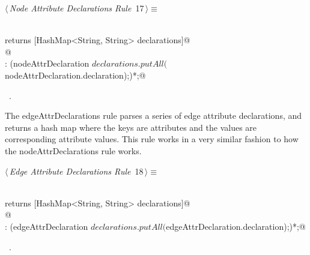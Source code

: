 \documentclass[a4paper]{report}
\begin{document}
\begin{flushleft} \small
\begin{minipage}{\linewidth}\label{scrap17}\raggedright\small
{} $\langle\,${\itshape Node Attribute Declarations Rule}\nobreak\ {\footnotesize {17}}$\,\rangle\equiv$
\vspace{-1ex}
\begin{list}{}{} \item
\mbox{}\verb@@\\
\mbox{}\verb@nodeAttrDeclarations returns [HashMap<String, String> declarations]@\\
\mbox{}@\\
\mbox{}\verb@: (nodeAttrDeclaration {$declarations.putAll($nodeAttrDeclaration.declaration);})*;@\\
\mbox{}\verb@@{\NWsep}
\end{list}
\vspace{-1.5ex}
\footnotesize
\begin{list}{}{\setlength{\itemsep}{-\parsep}\setlength{\itemindent}{-\leftmargin}}
\item \NWtxtMacroRefIn\ .

\item{}
\end{list}
\end{minipage}\vspace{4ex}
\end{flushleft}
The edgeAttrDeclarations rule parses a series of edge attribute declarations, and returns a hash map where the keys are attributes and the values are corresponding attribute values. This rule works in a very similar fashion to how the nodeAttrDeclarations rule works.
\begin{flushleft} \small
\begin{minipage}{\linewidth}\label{scrap18}\raggedright\small
{} $\langle\,${\itshape Edge Attribute Declarations Rule}\nobreak\ {\footnotesize {18}}$\,\rangle\equiv$
\vspace{-1ex}
\begin{list}{}{} \item
\mbox{}\verb@@\\
\mbox{}\verb@edgeAttrDeclarations returns [HashMap<String, String> declarations]@\\
\mbox{}@\\
\mbox{}\verb@: (edgeAttrDeclaration {$declarations.putAll($edgeAttrDeclaration.declaration);})*;@\\
\mbox{}\verb@@{\NWsep}
\end{list}
\vspace{-1.5ex}
\footnotesize
\begin{list}{}{\setlength{\itemsep}{-\parsep}\setlength{\itemindent}{-\leftmargin}}
\item \NWtxtMacroRefIn\ .

\item{}
\end{list}
\end{minipage}\vspace{4ex}
\end{flushleft}
\end{document}
